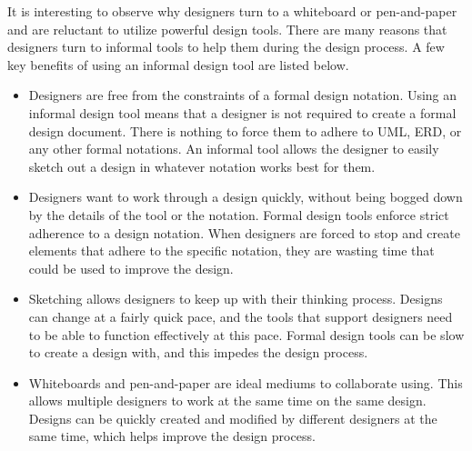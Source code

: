 It is interesting to observe why designers turn to a whiteboard or pen-and-paper and are reluctant to utilize powerful design tools.
There are many reasons that designers turn to informal tools to help them during the design process. 
A few key benefits of using an informal design tool are listed below.
\begin{itemize}\itemsep1pt
\item 
Designers are free from the constraints of a formal design notation. 
Using an informal design tool means that a designer is not required to create a formal design document. 
There is nothing to force them to adhere to UML, ERD, or any other formal notations. 
An informal tool allows the designer to easily sketch out a design in whatever notation works best for them.

\item 
Designers want to work through a design quickly, without being bogged down by the details of the tool or the notation.
Formal design tools enforce strict adherence to a design notation.
When designers are forced to stop and create elements that adhere to the specific notation, they are wasting time that could be used to improve the design.

\item 
Sketching allows designers to keep up with their thinking process. 
Designs can change at a fairly quick pace, and the tools that support designers need to be able to function effectively at this pace.
Formal design tools can be slow to create a design with, and this impedes the design process. 

\item 
Whiteboards and pen-and-paper are ideal mediums to collaborate using.
This allows multiple designers to work at the same time on the same design.
Designs can be quickly created and modified by different designers at the same time, which helps improve the design process.
\end{itemize}

